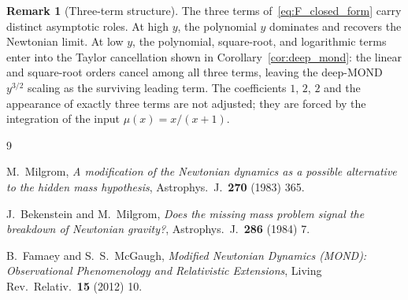 \documentclass[twocolumn]{iopjournal}
\theoremstyle{definition}
\newtheorem{remark}[lemma]{Remark}
\begin{document}
\begin{remark}[Three-term structure]
\label{rem:three_terms}
The three terms of~\eqref{eq:F_closed_form} carry distinct
asymptotic roles.  At high $y$, the polynomial $y$ dominates and
recovers the Newtonian limit.  At low $y$, the polynomial,
square-root, and logarithmic terms enter into the Taylor
cancellation shown in Corollary~\ref{cor:deep_mond}: the linear
and square-root orders cancel among all three terms, leaving the
deep-MOND $y^{3/2}$ scaling as the surviving leading term.  The
coefficients $1$, $2$, $2$ and the appearance of exactly three
terms are not adjusted; they are forced by the integration of the
input $\mu(x) = x/(x+1)$.
\end{remark}


\begin{thebibliography}{9}

M.~Milgrom,
\textit{A modification of the Newtonian dynamics as a possible
alternative to the hidden mass hypothesis},
Astrophys.\ J.\ \textbf{270} (1983) 365.

J.~Bekenstein and M.~Milgrom,
\textit{Does the missing mass problem signal the breakdown of
Newtonian gravity?},
Astrophys.\ J.\ \textbf{286} (1984) 7.

B.~Famaey and S.~S.~McGaugh,
\textit{Modified Newtonian Dynamics (MOND): Observational
Phenomenology and Relativistic Extensions},
Living Rev.\ Relativ.\ \textbf{15} (2012) 10.

\end{thebibliography}
\end{document}
